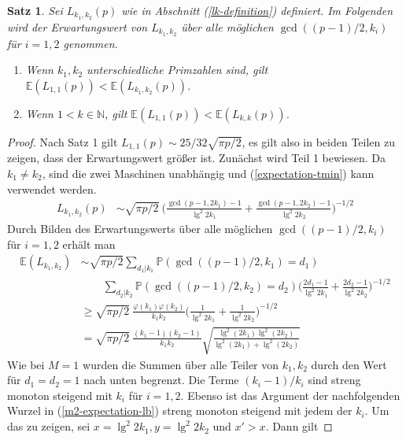 \documentclass[a4paper, 11pt, ngerman]{article}
\newcommand{\E}{\mathbb{E}}
\newcommand{\N}{\mathbb{N}}
\renewcommand{\P}{\mathbb{P}}
\newtheorem{theorem}{Satz}
\begin{document}
\begin{theorem}
    \label{theorem:optimal-k-m2}
    Sei $L_{k_1, k_2}(p)$ wie in Abschnitt (\ref{lk-definition}) definiert. Im Folgenden wird der Erwartungswert von $L_{k_1, k_2}$ über alle möglichen $\gcd((p - 1)/2, k_i)$ für $i = 1, 2$ genommen.
    \begin{enumerate}
        \item Wenn $k_1, k_2$ unterschiedliche Primzahlen sind, gilt $\E(L_{1, 1}(p)) < \E(L_{k_1, k_2}(p))$.
        \item Wenn $1 < k \in \N$, gilt $\E(L_{1, 1}(p)) < \E(L_{k, k}(p))$.
    \end{enumerate}
\end{theorem}

\begin{proof}
    Nach Satz 1 gilt $L_{1, 1}(p) \sim 25/32 \sqrt{\pi p /2}$, es gilt also in beiden Teilen zu zeigen, dass der Erwartungswert größer ist. Zunächst wird Teil 1 bewiesen. Da $k_1 \ne k_2$, sind die zwei Maschinen unabhängig und (\ref{expectation-tmin}) kann verwendet werden.
    \begin{align*}
        L_{k_1, k_2}(p)
         & \sim \sqrt{\pi p / 2} \
        \Bigg ( \frac {\gcd(p - 1, 2k_1) - 1} {\lg^2 2k_1} +
        \frac {\gcd(p -1, 2k_2) - 1} {\lg^2 2k_2} \Bigg )^{-1/2}
    \end{align*}
    Durch Bilden des Erwartungswerts über alle möglichen $\gcd((p - 1)/2, k_i)$ für $i = 1, 2$ erhält man
    \begin{align}
        \E(L_{k_1, k_2})
         & \sim \sqrt{\pi p / 2}
        \sum_{d_1 | k_1} \P(\gcd((p - 1)/2, k_1) = d_1)
        \nonumber                                                 \\
         & \qquad \sum_{d_2 | k_2} \P(\gcd((p - 1)/2, k_2) = d_2)
        \Bigg ( \frac {2d_1 - 1} {\lg^2 2k_1}
        + \frac {2d_2 - 1} {\lg^2 2k_2} \Bigg )^{-1/2}
        \nonumber                                                 \\
         & \ge \sqrt{\pi p / 2} \
        \frac {\varphi(k_1) \varphi(k_2)} {k_1k_2}
        \Bigg (\frac 1 {\lg^2 2k_1} + \frac 1 {\lg^2 2k_2} \Bigg )^{-1/2}
        \nonumber                                                 \\
         & = \sqrt{\pi p / 2} \
        \frac {(k_1 - 1) (k_2- 1)} {k_1k_2}
        \sqrt{\frac{\lg^2(2k_1) \lg^2(2k_2)}{\lg^2(2k_1) + \lg^2(2k_2)}}
        \label{m2-expectation-lb}
    \end{align}
    Wie bei $M = 1$ wurden die Summen über alle Teiler von $k_1, k_2$ durch den Wert für $d_1 = d_2 = 1$ nach unten begrenzt. Die Terme $(k_i - 1)/k_i$ sind streng monoton steigend mit $k_i$ für $i = 1, 2$. Ebenso ist das Argument der nachfolgenden Wurzel in (\ref{m2-expectation-lb}) streng monoton steigend mit jedem der $k_i$. Um das zu zeigen, sei $x = \lg^2 2k_1, y = \lg^2 2k_2$ und $x' > x$. Dann gilt

\end{proof}
\end{document}
